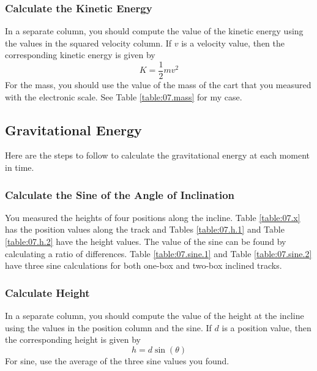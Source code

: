 \subsubsection{Calculate the Kinetic Energy}
In a separate column, you should compute the value of the kinetic energy using the values in the squared velocity column. If $v$ is a velocity value, then the corresponding kinetic energy is given by
\begin{equation}
    K = \frac{1}{2} m v^{2}
\end{equation}
For the mass, you should use the value of the mass of the cart that you measured with the electronic scale. See Table \ref{table:07.mass} for my case.
\subsection{Gravitational Energy}
Here are the steps to follow to calculate the gravitational energy at each moment in time.
\subsubsection{Calculate the Sine of the Angle of Inclination}
You measured the heights of four positions along the incline. Table \ref{table:07.x} has the position values along the track and Tables \ref{table:07.h.1} and Table \ref{table:07.h.2} have the height values. The value of the sine can be found by calculating a ratio of differences. Table \ref{table:07.sine.1} and Table \ref{table:07.sine.2} have three sine calculations for both one-box and two-box inclined tracks.
\subsubsection{Calculate Height}
In a separate column, you should compute the value of the height at the incline using the values in the position column and the sine. If $d$ is a position value, then the corresponding height is given by
\begin{equation}
    h = d \sin(\theta)
\end{equation}
For sine, use the average of the three sine values you found.
